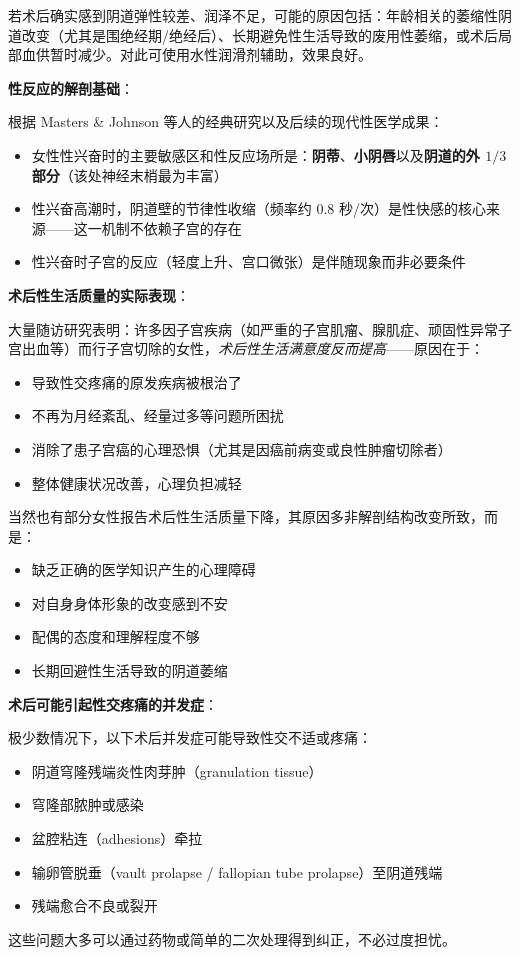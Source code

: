 若术后确实感到阴道弹性较差、润泽不足，可能的原因包括：年龄相关的萎缩性阴道改变（尤其是围绝经期/绝经后）、长期避免性生活导致的废用性萎缩，或术后局部血供暂时减少。对此可使用水性润滑剂辅助，效果良好。

\vspace{0.5em}
\noindent\textbf{性反应的解剖基础}：

根据 Masters \& Johnson 等人的经典研究以及后续的现代性医学成果：
\begin{itemize}
	\item 女性性兴奋时的主要敏感区和性反应场所是：\textbf{阴蒂}、\textbf{小阴唇}以及\textbf{阴道的外 $1/3$ 部分}（该处神经末梢最为丰富）
	\item 性兴奋高潮时，阴道壁的节律性收缩（频率约 0.8 秒/次）是性快感的核心来源——这一机制不依赖子宫的存在
	\item 性兴奋时子宫的反应（轻度上升、宫口微张）是伴随现象而非必要条件
\end{itemize}

\vspace{0.5em}
\noindent\textbf{术后性生活质量的实际表现}：

大量随访研究表明：许多因子宫疾病（如严重的子宫肌瘤、腺肌症、顽固性异常子宫出血等）而行子宫切除的女性，\textit{术后性生活满意度反而提高}——原因在于：
\begin{itemize}
	\item 导致性交疼痛的原发疾病被根治了
	\item 不再为月经紊乱、经量过多等问题所困扰
	\item 消除了患子宫癌的心理恐惧（尤其是因癌前病变或良性肿瘤切除者）
	\item 整体健康状况改善，心理负担减轻
\end{itemize}

当然也有部分女性报告术后性生活质量下降，其原因多非解剖结构改变所致，而是：
\begin{itemize}
	\item 缺乏正确的医学知识产生的心理障碍
	\item 对自身身体形象的改变感到不安
	\item 配偶的态度和理解程度不够
	\item 长期回避性生活导致的阴道萎缩
\end{itemize}

\vspace{0.5em}
\noindent\textbf{术后可能引起性交疼痛的并发症}：

极少数情况下，以下术后并发症可能导致性交不适或疼痛：
\begin{itemize}
	\item 阴道穹隆残端炎性肉芽肿（granulation tissue）
	\item 穹隆部脓肿或感染
	\item 盆腔粘连（adhesions）牵拉
	\item 输卵管脱垂（vault prolapse / fallopian tube prolapse）至阴道残端
	\item 残端愈合不良或裂开
\end{itemize}
这些问题大多可以通过药物或简单的二次处理得到纠正，不必过度担忧。

